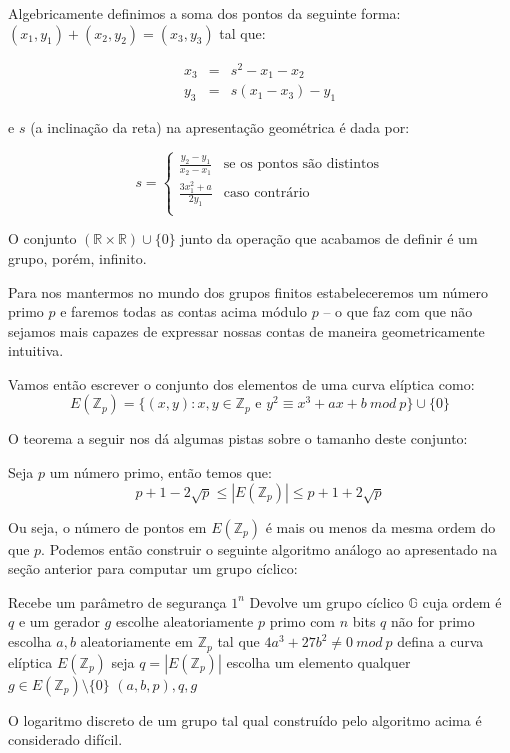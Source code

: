Algebricamente definimos a soma dos pontos da seguinte forma: $(x_1, y_1) + (x_2, y_2) = (x_3, y_3)$ tal que:

\begin{eqnarray*}
x_3 & = & s^2 - x_1 - x_2\\
y_3 & = & s(x_1 - x_3) - y_1  
\end{eqnarray*}

e $s$ (a inclinação da reta) na apresentação geométrica é dada por:

\begin{displaymath}
  s =\left\{
  \begin{array}{cl}
    \frac{y_2 - y_1}{x_2 - x_1} & \textrm{se os pontos são distintos}\\
    \frac{3x_1^2 + a}{2y_1} & \textrm{caso contrário}\\
  \end{array}\right .
\end{displaymath}


O conjunto $(\mathbb{R} \times \mathbb{R}) \cup \{0\}$ junto da operação que acabamos de definir é um grupo, porém, infinito.

Para nos mantermos no mundo dos grupos finitos estabeleceremos um número primo $p$ e faremos todas as contas acima módulo $p$ -- o que faz com que não sejamos mais capazes de expressar nossas contas de maneira geometricamente intuitiva.

Vamos então escrever o conjunto dos elementos de uma curva elíptica como:
\begin{displaymath}
  E(\mathbb{Z}_p) = \{(x,y) : x, y \in \mathbb{Z}_p \textrm{ e } y^2 \equiv x^3 + ax + b\ mod\ p\} \cup \{0\}
\end{displaymath}

O teorema a seguir nos dá algumas pistas sobre o tamanho deste conjunto:


\begin{theorem}[Hasse]
  Seja $p$ um número primo, então temos que:
\begin{displaymath}
  p + 1 - 2\sqrt{p} \leq |E(\mathbb{Z}_p)| \leq p + 1 + 2\sqrt{p} 
\end{displaymath}
\end{theorem}

Ou seja, o número de pontos em $E(\mathbb{Z}_p)$ é mais ou menos da mesma ordem do que $p$.
Podemos então construir o seguinte algoritmo análogo ao apresentado na seção anterior para computar um grupo cíclico:


\begin{codebox}
\li \Comment Recebe um parâmetro de segurança $1^n$
\li \Comment Devolve um grupo cíclico $\mathbb{G}$ cuja ordem é $q$ e um gerador $g$
\li escolhe aleatoriamente $p$ primo com $n$ bits
\li \While $q$ não for primo 
\li \Do escolha $a, b$ aleatoriamente em $\mathbb{Z}_p$ tal que $4a^3 + 27b^2 \neq 0\ mod\ p$
\li defina a curva elíptica $E(\mathbb{Z}_p)$
\li seja $q = |E(\mathbb{Z}_p)|$
\End
\li escolha um elemento qualquer $g \in E(\mathbb{Z}_p) \setminus \{0\}$
\li \Return $(a, b, p), q, g$
\end{codebox}

O logaritmo discreto de um grupo tal qual construído pelo algoritmo acima é considerado difícil.